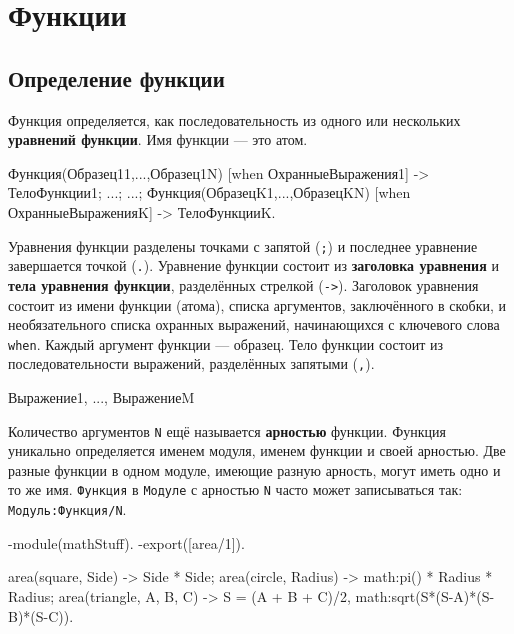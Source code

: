 \chapter{Функции}

\section{Определение функции}

Функция определяется, как последовательность из одного или нескольких  
\textbf{уравнений функции}. Имя функции --- это атом.

\vspace*{4pt}
\begin{erlangru}
Функция(Образец11,...,Образец1N)
  [when ОхранныеВыражения1] -> ТелоФункции1;
...;
...;
Функция(ОбразецK1,...,ОбразецKN)
  [when ОхранныеВыраженияK] -> ТелоФункцииK.
\end{erlangru}
\vspace*{4pt}

Уравнения функции разделены точками с запятой (\texttt{;}) и последнее уравнение
завершается точкой (\texttt{.}). Уравнение функции состоит из \textbf{заголовка
уравнения} и \textbf{тела уравнения функции}, разделённых стрелкой (\texttt{->}).
Заголовок уравнения состоит из имени функции (атома), списка аргументов, 
заключённого в скобки, и необязательного списка охранных выражений, начинающихся
с ключевого слова \texttt{when}.  Каждый аргумент функции --- образец.  Тело 
функции состоит из последовательности выражений, разделённых запятыми (\texttt{,}).

\vspace*{4pt}
\begin{erlangru}
Выражение1,
...,
ВыражениеM
\end{erlangru}
\vspace*{4pt}

Количество аргументов \texttt{N} ещё называется \textbf{арностью} функции.
Функция уникально определяется именем модуля, именем функции и своей арностью. 
Две разные функции в одном модуле, имеющие разную арность, могут иметь одно и то
же имя.  \texttt{Функция} в \texttt{Модуле} с арностью \texttt{N} часто может
записываться так: \texttt{Модуль:Функция/N}.

\vspace*{4pt}
\begin{erlang}
-module(mathStuff).
-export([area/1]).

area({square, Side}) -> Side * Side;
area({circle, Radius}) -> math:pi() * Radius * Radius;
area({triangle, A, B, C}) ->
    S = (A + B + C)/2,
    math:sqrt(S*(S-A)*(S-B)*(S-C)).
\end{erlang}

